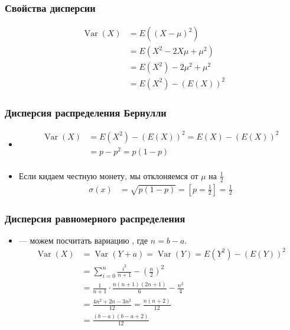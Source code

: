\documentclass[hyperref=unicode,graphics=pdflatex,13pt,xcolor={usenames,dvipsnames}]{beamer}
\renewcommand\emph[1]{{\color{blue}{#1}}}
\newcommand\pitem{\pause\item}
\DeclareMathOperator{\Bern}{Bern}
\DeclareMathOperator{\Var}{Var}
\begin{document}
\begin{frame}
  \frametitle{Свойства дисперсии}
  \begin{center}
  \end{center}
  
  \pause

  \begin{align*}
    \Var(X) &= E\left((X - \mu)^2\right) \\
    &= E\left(X^2 - 2X\mu + \mu^2\right) \\
    &= E(X^2) - 2\mu^2 + \mu^2 \\
    &= E(X^2) - (E(X))^2 
  \end{align*}
\end{frame}

\begin{frame}
  \frametitle{Дисперсия распределения Бернулли}
  \begin{itemize}
    \item \emph{$X \sim \Bern(p)$}
    \begin{align*}
      \Var(X) &= E(X^2) - (E(X))^2 = E(X) - (E(X))^2 \\
              &= p - p^2 = p(1 - p) \\
    \end{align*}
    \pitem Если кидаем честную монету, мы \emph{всегда} отклоняемся от $\mu$ на $\frac{1}{2}$
    \begin{align*}
      \sigma(x) &= \sqrt{p(1 - p)} = \left[p = \frac{1}{2}\right] = \frac{1}{2}
    \end{align*} 
  \end{itemize}
\end{frame}

\begin{frame}
  \frametitle{Дисперсия равномерного распределения}

  \begin{itemize}
    \item \emph{$X \sim U(a, b)$} --- можем посчитать вариацию \emph{$Y = X - a \sim U(0, n)$}, где $n = b - a$. 
    \begin{align*}
      \Var(X) &= \Var(Y + a) = \Var(Y) = E(Y^2) - (E(Y))^2 \\
              &= \sum_{i = 0}^n \frac{i^2}{n + 1} - \left(\frac{n}{2}\right)^2 \\
              &= \frac{1}{n + 1} \cdot \frac{n(n + 1)(2n + 1)}{6} - \frac{n^2}{4} \\
              &= \frac{4n^2 + 2n - 3n^2}{12} = \frac{n(n + 2)}{12} \\
              &= \frac{(b - a)(b - a + 2)}{12}
    \end{align*}
  \end{itemize}
  

\end{frame}
\end{document}
